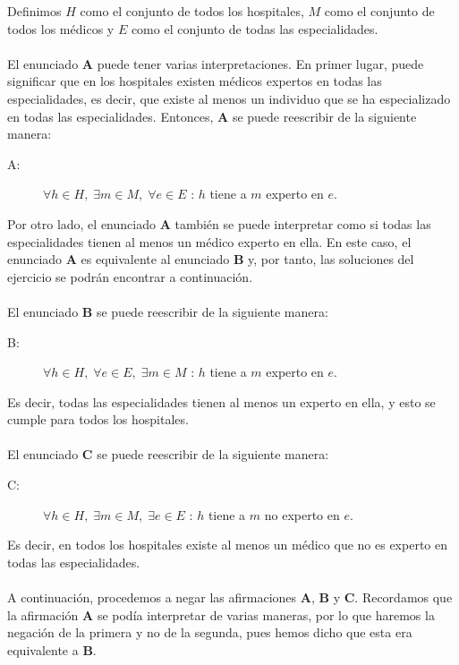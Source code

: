 \documentclass{article}
\begin{document}
\begin{sol}
Definimos $\displaystyle H $ como el conjunto de todos los hospitales, $\displaystyle M $ como el conjunto de todos los médicos y $\displaystyle E $ como el conjunto de todas las especialidades. \\ \\
El enunciado \textbf{A} puede tener varias interpretaciones. En primer lugar, puede significar que en los hospitales existen médicos expertos en todas las especialidades, es decir, que existe al menos un individuo que se ha especializado en todas las especialidades. Entonces, \textbf{A} se puede reescribir de la siguiente manera:
\begin{description}
\item[A:] $\displaystyle \forall h \in H,\; \exists m \in M,\; \forall e \in E $ : $\displaystyle h $ tiene a $\displaystyle m $ experto en $\displaystyle e $. 
\end{description}
Por otro lado, el enunciado \textbf{A} también se puede interpretar como si todas las especialidades tienen al menos un médico experto en ella. En este caso, el enunciado \textbf{A} es equivalente al enunciado \textbf{B} y, por tanto, las soluciones del ejercicio se podrán encontrar a continuación. \\ \\
El enunciado \textbf{B} se puede reescribir de la siguiente manera:
\begin{description}
\item[B:] $\displaystyle \forall h \in H,\; \forall e \in E,\; \exists m \in M $ : $\displaystyle h $ tiene a $\displaystyle m $ experto en $\displaystyle e $. 
\end{description}
Es decir, todas las especialidades tienen al menos un experto en ella, y esto se cumple para todos los hospitales. \\ \\
El enunciado \textbf{C} se puede reescribir de la siguiente manera:
\begin{description}
\item[C:] $\displaystyle \forall h \in H,\; \exists m \in M,\; \exists e \in E $ : $\displaystyle h $ tiene a $\displaystyle m $ no experto en $\displaystyle e $. 
\end{description}
Es decir, en todos los hospitales existe al menos un médico que no es experto en todas las especialidades. \\ \\
A continuación, procedemos a negar las afirmaciones \textbf{A}, \textbf{B} y \textbf{C}. Recordamos que la afirmación \textbf{A} se podía interpretar de varias maneras, por lo que haremos la negación de la primera y no de la segunda, pues hemos dicho que esta era equivalente a \textbf{B}. 

\end{sol}
\end{document}
